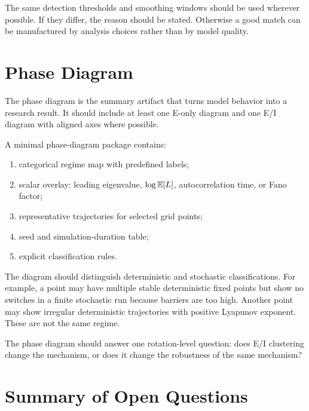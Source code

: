 The same detection thresholds and smoothing windows should be used wherever possible. If they differ, the reason should be stated. Otherwise a good match can be manufactured by analysis choices rather than by model quality.

\section{Phase Diagram}
\label{sec:phase-diagram-artifact}

The phase diagram is the summary artifact that turns model behavior into a research result. It should include at least one E-only diagram and one E/I diagram with aligned axes where possible.

A minimal phase-diagram package contains:
%
\begin{enumerate}[leftmargin=*]
  \item categorical regime map with predefined labels;
  \item scalar overlay: leading eigenvalue, $\log\mathbb{E}[L]$, autocorrelation time, or Fano factor;
  \item representative trajectories for selected grid points;
  \item seed and simulation-duration table;
  \item explicit classification rules.
\end{enumerate}

The diagram should distinguish deterministic and stochastic classifications. For example, a point may have multiple stable deterministic fixed points but show no switches in a finite stochastic run because barriers are too high. Another point may show irregular deterministic trajectories with positive Lyapunov exponent. These are not the same regime.

The phase diagram should answer one rotation-level question: does E/I clustering change the mechanism, or does it change the robustness of the same mechanism?

\section{Summary of Open Questions}
\label{sec:summary-open-questions-artifact}

